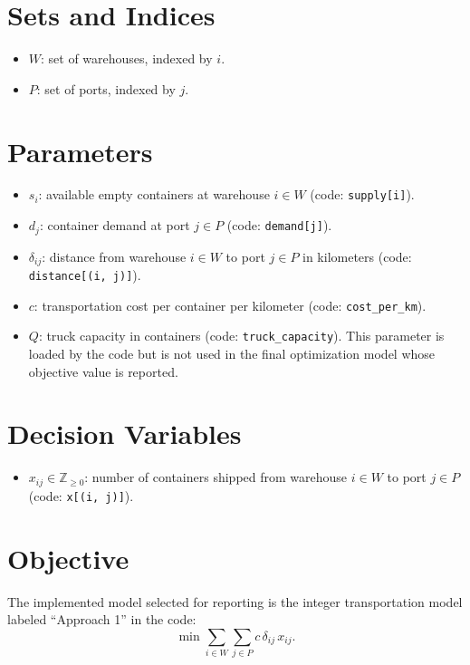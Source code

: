 \section*{Sets and Indices}

\begin{itemize}
    \item $W$: set of warehouses, indexed by $i$.
    \item $P$: set of ports, indexed by $j$.
\end{itemize}

\section*{Parameters}

\begin{itemize}
    \item $s_i$: available empty containers at warehouse $i \in W$ (code: \texttt{supply[i]}).
    \item $d_j$: container demand at port $j \in P$ (code: \texttt{demand[j]}).
    \item $\delta_{ij}$: distance from warehouse $i \in W$ to port $j \in P$ in kilometers (code: \texttt{distance[(i, j)]}).
    \item $c$: transportation cost per container per kilometer (code: \texttt{cost\_per\_km}).
    \item $Q$: truck capacity in containers (code: \texttt{truck\_capacity}). This parameter is loaded by the code but is not used in the final optimization model whose objective value is reported.
\end{itemize}

\section*{Decision Variables}

\begin{itemize}
    \item $x_{ij} \in \mathbb{Z}_{\ge 0}$: number of containers shipped from warehouse $i \in W$ to port $j \in P$ (code: \texttt{x[(i, j)]}).
\end{itemize}

\section*{Objective}

The implemented model selected for reporting is the integer transportation model labeled ``Approach 1'' in the code:
\[
\min \sum_{i \in W}\sum_{j \in P} c \,\delta_{ij}\, x_{ij}.
\]

